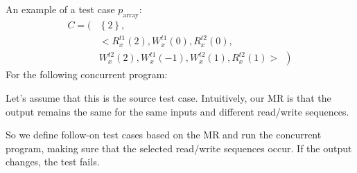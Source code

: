 \begin{examplebox}
    An example of a test case $p_{\text{array}}$:
    \begin{equation*}
        \begin{array}{ll}
            C = (&\left\{2\right\}, \\ [.5em]
            &
            < 
            R_{x}^{t1}\left(2\right), 
            W_{x}^{t1}\left(0\right), 
            R_{x}^{t2}\left(0\right), \\ [.5em]
            & \left.
            W_{x}^{t2}\left(2\right), 
            W_{x}^{t1}\left(-1\right), 
            W_{x}^{t2}\left(1\right), 
            R_{x}^{t2}\left(1\right) 
            > \:\:\right) 
        \end{array}
    \end{equation*}
    For the following concurrent program:
    
    Let's assume that this is the source test case. Intuitively, our MR is that the output remains the same for the same inputs and different read/write sequences.

    So we define follow-on test cases based on the MR and run the concurrent program, making sure that the selected read/write sequences occur. If the output changes, the test fails.
\end{examplebox}

